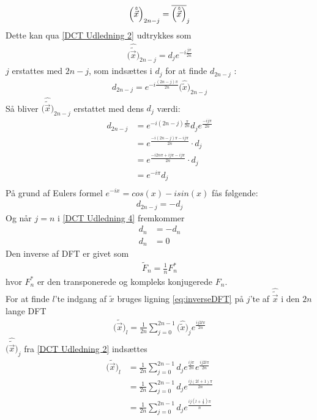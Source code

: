 \begin{align*}
\Big(\hat{\tilde{\vec{{x}}}}\Big)_{2n-j} = \overline{\Big{(\hat{\tilde{\vec{x}}}}\Big)}_j
\end{align*}
Dette kan qua \ref{DCT Udledning 2} udtrykkes som
\begin{align*}
\Big(\hat{\tilde{\vec{x}}}\Big)_{2n-j} = d_j e^{-i\frac{j\pi}{2n}}
\end{align*}
$j$ erstattes med $2n - j$, som indsættes i $d_j$ for at finde $d_{2n-j}$ :
\begin{align*}
d_{2n-j} = e^{-i\frac{(2n-j)\pi}{2n}} \big(\hat{\tilde{x}}\big)_{2n-j}
\end{align*}
Så bliver $\Big(\hat{\tilde{\vec{x}}}\Big)_{2n-j}$ erstattet med dens $d_j$ værdi:
\begin{equation*}
\begin{split}
d_{2n-j}& = e^{-i(2n-j)\frac{\pi}{2n}} d_j e^{\frac{-ij\pi}{2n}} \\
  & = e^{\frac{-i(2n-j)\pi-ij\pi}{2n}} \cdot d_j \\
  & = e^{\frac{-i2n\pi+ij\pi-ij\pi}{2n}} \cdot d_j \\
  & = e^{-i\pi} d_j \\
\end{split}
\end{equation*}
På grund af Eulers formel $e^{-ix} = cos(x)-isin(x)$ fås følgende:
\begin{align}
d_{2n-j} = -d_j
\label{DCT Udledning 4}
\end{align}
Og når $j = n$ i \ref{DCT Udledning 4} fremkommer
\begin{align}
d_n& = -d_n \\ 
d_n& = 0
\label{DCT Udledning 5}
\end{align}
Den inverse af DFT er givet som
\begin{align}
\tilde{F}_n = \frac{1}{n} F^{*}_{n}
\label{eq:inverseDFT}
\end{align}
hvor $F^{*}_{n}$ er den transponerede og kompleks konjugerede $F_n$. \\
For at finde $l$'te indgang af  $\tilde{x}$ bruges ligning \ref{eq:inverseDFT} på $j$'te af $\hat{\tilde{\vec{x}}}$ i den $2n$ lange DFT
\begin{align*}
\Big(\tilde{\vec{x}}\Big)_l = \frac{1}{2n} \sum^{2n-1}_{j=0} \Big(\hat{\tilde{x}}\Big)_j e^{\frac{ij2l\pi}{2n}} 
\end{align*}
$\Big(\hat{\tilde{\vec{x}}}\Big)_j$ fra \ref{DCT Udledning 2} indsættes
\begin{equation}
\begin{split}
\Big(\tilde{\vec{x}}\Big)_l& = \frac{1}{2n} \sum^{2n-1}_{j=0} d_j e^{\frac{ij\pi}{2n}} e^{\frac{ij2l\pi}{2n}} \\
  & =\frac{1}{2n} \sum^{2n-1}_{j=0} d_j e^{\frac{ij(2l+1)\pi}{2n}} \\
  & =\frac{1}{2n} \sum^{2n-1}_{j=0} d_j e^{\frac{ij(l+\frac{1}{2})\pi}{n}}
\end{split}
\label{DCT Udledning 6}
\end{equation}
